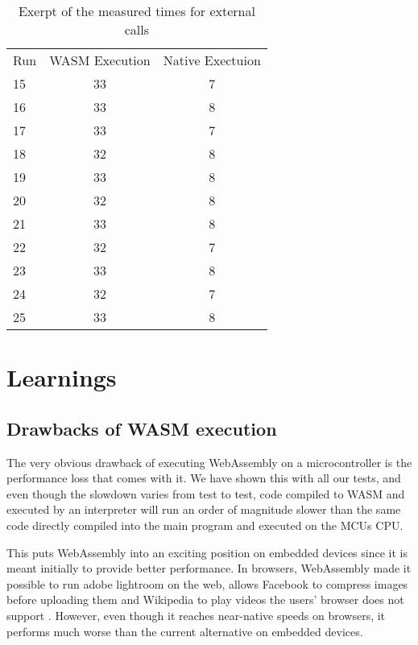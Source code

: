 \begin{table} [h]
    \begin{tabular}{l c c}
        Run & WASM Execution & Native Exectuion \\
        15  & 33             & 7                \\
        16  & 33             & 8                \\
        17  & 33             & 7                \\
        18  & 32             & 8                \\
        19  & 33             & 8                \\
        20  & 32             & 8                \\
        21  & 33             & 8                \\
        22  & 32             & 7                \\
        23  & 33             & 8                \\
        24  & 32             & 7                \\
        25  & 33             & 8                \\
    \end{tabular}
    \caption{Exerpt of the measured times for external calls}
    \label{tab:times_native}
\end{table}

\section{Learnings}
\subsection{Drawbacks of WASM execution}
The very obvious drawback of executing WebAssembly on a microcontroller is the performance loss that comes with it. We have shown this with all our tests, and even though the slowdown varies from test to test, code compiled to WASM and executed by an interpreter will run an order of magnitude slower than the same code directly compiled into the main program and executed on the MCUs CPU.

This puts WebAssembly into an exciting position on embedded devices since it is meant initially to provide better performance. In browsers, WebAssembly made it possible to run adobe lightroom on the web, allows Facebook to compress images before uploading them and Wikipedia to play videos the users' browser does not support \autocite{wagner_webassembly_2017}. However, even though it reaches near-native speeds on browsers, it performs much worse than the current alternative on embedded devices.

